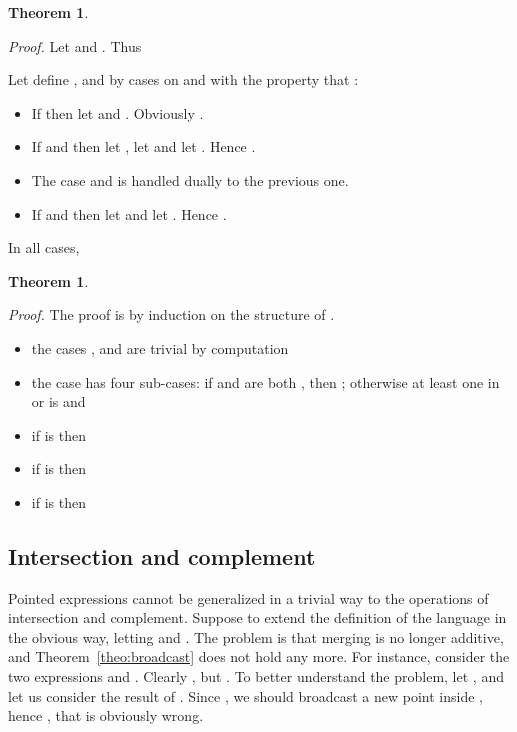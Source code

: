 \documentclass[preprint]{sigplanconf}
\newcounter{item}
\newtheorem{theorem}[item]{Theorem}
\newenvironment{proof}{\begin{trivlist}\item[]{\em Proof.}}{\end{trivlist}}
\begin{document}
\begin{theorem}

\end{theorem}
\begin{proof}
Let  and .
Thus


Let define ,  and  by cases on  and  with
the property that :
\begin{itemize}
 \item If  then let  and
  . Obviously .
 \item If  and  then
   let , let
    and let . Hence .
 \item The case  and  is handled dually to the
   previous one.
 \item If  and  then
   let 
   and let . Hence .
\end{itemize}

In all cases,

\end{proof}

\begin{theorem}
\label{theo:move_dag}

\end{theorem}
\begin{proof}
The proof is by induction on the structure of .
\begin{itemize}
\item the cases ,  and  are trivial by
      computation
\item the case  has four sub-cases: if  and  are both ,
      then ;
      otherwise
      at least one in  or  is  and
      
\item if  is  then

\item if  is  then

\item if  is  then

      
\end{itemize}
\end{proof}

\subsection{Intersection and complement}
\label{sec:intersection}
Pointed expressions cannot be generalized in a trivial way to
the operations of intersection and complement. Suppose to 
extend the definition of the language in the obvious way, letting
 and 
. The problem is that merging
is no longer additive, and Theorem~\ref{theo:broadcast} does not
hold any more.
For instance, consider the two expressions  and
. Clearly , but
.
To better understand the problem, 
let , and let us 
consider the result of . 
Since , we should
broadcast a new point inside , 
hence ,
that is obviously wrong.
\end{document}
